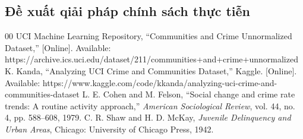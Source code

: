 \documentclass[conference]{IEEEtran}
\begin{document}
\subsection{Đề xuất qiải pháp chính sách thực tiễn}

\begin{thebibliography}{00}
 UCI Machine Learning Repository, ``Communities and Crime Unnormalized Dataset,'' [Online]. Available: https://archive.ics.uci.edu/dataset/211/communities+and+crime+unnormalized
 K. Kanda, ``Analyzing UCI Crime and Communities Dataset,'' Kaggle. [Online]. Available: https://www.kaggle.com/code/kkanda/analyzing-uci-crime-and-communities-dataset
 L. E. Cohen and M. Felson, ``Social change and crime rate trends: A routine activity approach,'' \textit{American Sociological Review}, vol. 44, no. 4, pp. 588--608, 1979.
 C. R. Shaw and H. D. McKay, \textit{Juvenile Delinquency and Urban Areas}, Chicago: University of Chicago Press, 1942.
\end{thebibliography}
\end{document}
